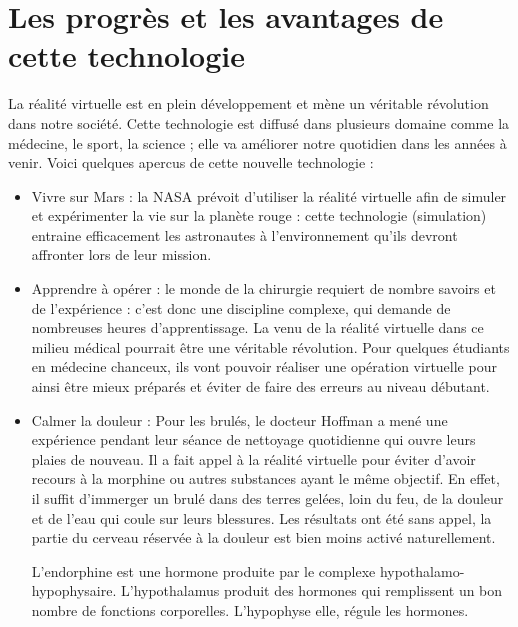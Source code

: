 \documentclass[12pt, a4paper]{report}
\begin{document}
\section[Avantages]{Les progrès et les avantages de cette technologie}

La réalité virtuelle est en plein développement et mène un véritable révolution dans notre société. Cette technologie est diffusé dans plusieurs domaine comme la médecine, le sport, la science ; elle va améliorer notre quotidien dans les années à venir.
Voici quelques apercus de cette nouvelle technologie :
\begin{itemize}
  \item Vivre sur Mars : la NASA prévoit d'utiliser la réalité virtuelle afin de simuler et expérimenter la vie sur la planète rouge : cette technologie (simulation) entraine efficacement les astronautes à l'environnement qu'ils devront affronter lors de leur mission.

  \item Apprendre à opérer : le monde de la chirurgie requiert de nombre savoirs et de l'expérience : c'est donc une discipline complexe, qui demande de nombreuses heures d'apprentissage. La venu de la réalité virtuelle dans ce milieu médical pourrait être une véritable révolution. Pour quelques étudiants en médecine chanceux, ils vont pouvoir réaliser une opération virtuelle pour ainsi être mieux préparés et éviter de faire des erreurs au niveau débutant.

  \item Calmer la douleur : Pour les brulés, le docteur Hoffman a mené une expérience pendant leur séance de nettoyage quotidienne qui ouvre leurs plaies de nouveau. Il a fait appel à la réalité virtuelle pour éviter d'avoir recours à la morphine ou autres substances ayant le même objectif. En effet, il suffit d'immerger un brulé dans des terres gelées, loin du feu, de la douleur et de l'eau qui coule sur leurs blessures. Les résultats ont été sans appel, la partie du cerveau réservée à la douleur est bien moins activé naturellement.

  L'endorphine est une hormone produite par le complexe hypothalamo-hypophysaire. L'hypothalamus produit des hormones qui remplissent un bon nombre de fonctions corporelles. L'hypophyse elle, régule les hormones.
\end{itemize}
\end{document}
